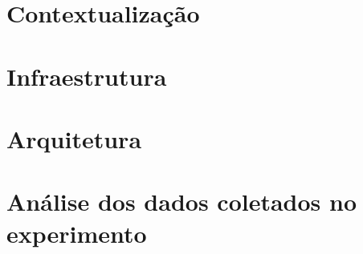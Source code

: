 \section{Contextualização}


\section{Infraestrutura}


\section{Arquitetura}


\section{Análise dos dados coletados no experimento}

